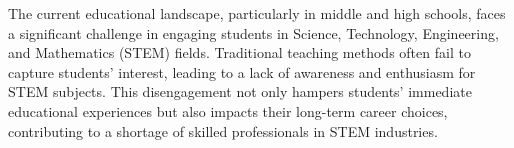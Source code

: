 The current educational landscape, particularly in middle and high schools, faces a significant challenge in engaging students in Science, Technology, Engineering, and Mathematics (STEM) fields. Traditional teaching methods often fail to capture students' interest, leading to a lack of awareness and enthusiasm for STEM subjects. This disengagement not only hampers students' immediate educational experiences but also impacts their long-term career choices, contributing to a shortage of skilled professionals in STEM industries.
